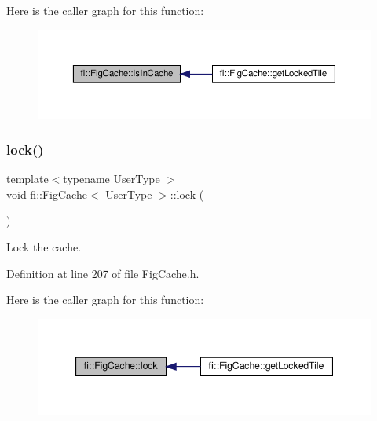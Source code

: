 Here is the caller graph for this function\+:
\nopagebreak
\begin{figure}[H]
\begin{center}
\leavevmode
\includegraphics[width=350pt]{d7/d31/classfi_1_1FigCache_a4d4792d8a1d737b5b6baa261c1761751_icgraph}
\end{center}
\end{figure}
\mbox{\label{classfi_1_1FigCache_aa67a984797e38073d2c3a4697b8e472f}} 
\subsubsection{\texorpdfstring{lock()}{lock()}}
{\footnotesize\ttfamily template$<$typename User\+Type $>$ \\
void \hyperlink{classfi_1_1FigCache}{fi\+::\+Fig\+Cache}$<$ User\+Type $>$\+::lock (\begin{DoxyParamCaption}{ }\end{DoxyParamCaption})\hspace{0.3cm}{\ttfamily [inline]}}



Lock the cache. 



Definition at line 207 of file Fig\+Cache.\+h.

Here is the caller graph for this function\+:
\nopagebreak
\begin{figure}[H]
\begin{center}
\leavevmode
\includegraphics[width=347pt]{d7/d31/classfi_1_1FigCache_aa67a984797e38073d2c3a4697b8e472f_icgraph}
\end{center}
\end{figure}
\mbox{\label{classfi_1_1FigCache_ae4968e08ba288e6df782364a368ff708}} 
